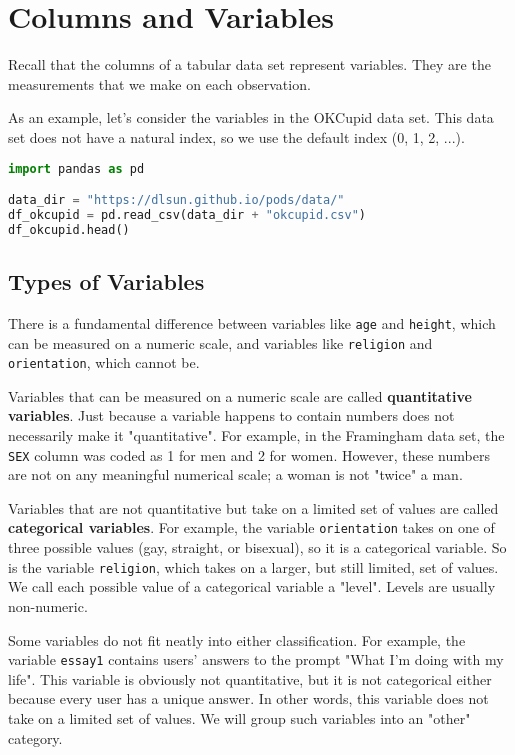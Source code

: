 \section{Columns and Variables}\label{1.3}

Recall that the columns of a tabular data set represent variables. They are the measurements that we make on each observation.

As an example, let's consider the variables in the OKCupid data set. This data set does not have a natural index, so we use the default index (0, 1, 2, ...).

\begin{lstlisting}[language=Python]
import pandas as pd

data_dir = "https://dlsun.github.io/pods/data/"
df_okcupid = pd.read_csv(data_dir + "okcupid.csv")
df_okcupid.head()
\end{lstlisting}




\subsection{Types of Variables}\label{1.3.1}

There is a fundamental difference between variables like \verb|age| and \verb|height|, which can be measured on a numeric scale, and variables like \verb|religion| and \verb|orientation|, which cannot be.

Variables that can be measured on a numeric scale are called \textbf{quantitative variables}. Just because a variable happens to contain numbers does not necessarily make it "quantitative". For example, in the Framingham data set, the \verb|SEX| column was coded as 1 for men and 2 for women. However, these numbers are not on any meaningful numerical scale; a woman is not "twice" a man.

Variables that are not quantitative but take on a limited set of values are called \textbf{categorical variables}. For example, the variable \verb|orientation| takes on one of three possible values (gay, straight, or bisexual), so it is a categorical variable. So is the variable \verb|religion|, which takes on a larger, but still limited, set of values. We call each possible value of a categorical variable a "level". Levels are usually non-numeric.

Some variables do not fit neatly into either classification. For example, the variable \verb|essay1| contains users' answers to the prompt "What I’m doing with my life". This variable is obviously not quantitative, but it is not categorical either because every user has a unique answer. In other words, this variable does not take on a limited set of values. We will group such variables into an "other" category.

